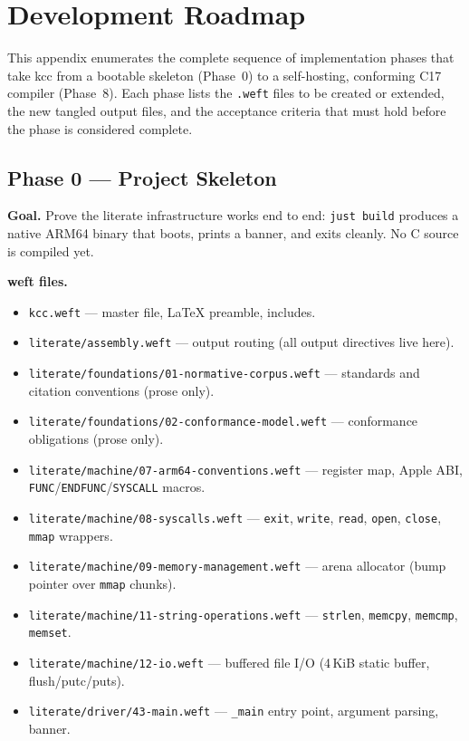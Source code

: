 \documentclass[11pt,a4paper,twoside,openright,DIV=15]{scrbook}
\theoremstyle{definition}
\theoremstyle{plain}
\theoremstyle{remark}
\newcommand{\kcc}{\textsf{kcc}}
\begin{document}
%

\chapter{Development Roadmap}
\label{ch:roadmap}

This appendix enumerates the complete sequence of implementation
phases that take \kcc{} from a bootable skeleton (Phase~0) to a
self-hosting, conforming C17 compiler (Phase~8).  Each phase lists
the \texttt{.weft} files to be created or extended, the new tangled
output files, and the acceptance criteria that must hold before the
phase is considered complete.

\section{Phase 0 --- Project Skeleton}
\label{sec:phase0}

\textbf{Goal.}  Prove the literate infrastructure works end to end:
\texttt{just build} produces a native ARM64 binary that boots,
prints a banner, and exits cleanly.  No C source is compiled yet.

\textbf{weft files.}
\begin{itemize}
\item \texttt{kcc.weft} --- master file, LaTeX preamble, includes.
\item \texttt{literate/assembly.weft} --- output routing (all
      output directives live here).
\item \texttt{literate/foundations/01-normative-corpus.weft} ---
      standards and citation conventions (prose only).
\item \texttt{literate/foundations/02-conformance-model.weft} ---
      conformance obligations (prose only).
\item \texttt{literate/machine/07-arm64-conventions.weft} ---
      register map, Apple ABI, \texttt{FUNC}/\texttt{ENDFUNC}/\texttt{SYSCALL} macros.
\item \texttt{literate/machine/08-syscalls.weft} ---
      \texttt{exit}, \texttt{write}, \texttt{read}, \texttt{open},
      \texttt{close}, \texttt{mmap} wrappers.
\item \texttt{literate/machine/09-memory-management.weft} ---
      arena allocator (bump pointer over \texttt{mmap} chunks).
\item \texttt{literate/machine/11-string-operations.weft} ---
      \texttt{strlen}, \texttt{memcpy}, \texttt{memcmp}, \texttt{memset}.
\item \texttt{literate/machine/12-io.weft} ---
      buffered file I/O (4\,KiB static buffer, flush/putc/puts).
\item \texttt{literate/driver/43-main.weft} ---
      \texttt{\_main} entry point, argument parsing, banner.
\end{itemize}
\end{document}
